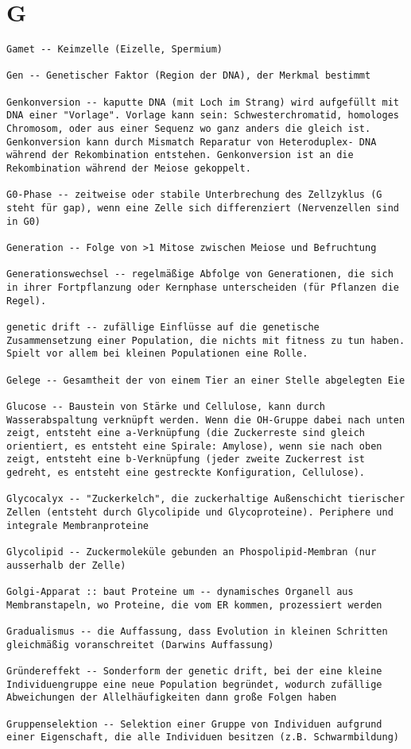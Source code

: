 \documentclass{article}
\begin{document}
\section{G}
\begin{verbatim}
Gamet -- Keimzelle (Eizelle, Spermium)

Gen -- Genetischer Faktor (Region der DNA), der Merkmal bestimmt

Genkonversion -- kaputte DNA (mit Loch im Strang) wird aufgefüllt mit DNA einer "Vorlage". Vorlage kann sein: Schwesterchromatid, homologes Chromosom, oder aus einer Sequenz wo ganz anders die gleich ist. Genkonversion kann durch Mismatch Reparatur von Heteroduplex- DNA während der Rekombination entstehen. Genkonversion ist an die Rekombination während der Meiose gekoppelt.

G0-Phase -- zeitweise oder stabile Unterbrechung des Zellzyklus (G steht für gap), wenn eine Zelle sich differenziert (Nervenzellen sind in G0)

Generation -- Folge von >1 Mitose zwischen Meiose und Befruchtung

Generationswechsel -- regelmäßige Abfolge von Generationen, die sich in ihrer Fortpflanzung oder Kernphase unterscheiden (für Pflanzen die Regel).

genetic drift -- zufällige Einflüsse auf die genetische Zusammensetzung einer Population, die nichts mit fitness zu tun haben. Spielt vor allem bei kleinen Populationen eine Rolle.

Gelege -- Gesamtheit der von einem Tier an einer Stelle abgelegten Eie

Glucose -- Baustein von Stärke und Cellulose, kann durch Wasserabspaltung verknüpft werden. Wenn die OH-Gruppe dabei nach unten zeigt, entsteht eine a-Verknüpfung (die Zuckerreste sind gleich orientiert, es entsteht eine Spirale: Amylose), wenn sie nach oben zeigt, entsteht eine b-Verknüpfung (jeder zweite Zuckerrest ist gedreht, es entsteht eine gestreckte Konfiguration, Cellulose).

Glycocalyx -- "Zuckerkelch", die zuckerhaltige Außenschicht tierischer Zellen (entsteht durch Glycolipide und Glycoproteine). Periphere und integrale Membranproteine

Glycolipid -- Zuckermoleküle gebunden an Phospolipid-Membran (nur ausserhalb der Zelle)

Golgi-Apparat :: baut Proteine um -- dynamisches Organell aus Membranstapeln, wo Proteine, die vom ER kommen, prozessiert werden

Gradualismus -- die Auffassung, dass Evolution in kleinen Schritten gleichmäßig voranschreitet (Darwins Auffassung)

Gründereffekt -- Sonderform der genetic drift, bei der eine kleine Individuengruppe eine neue Population begründet, wodurch zufällige Abweichungen der Allelhäufigkeiten dann große Folgen haben

Gruppenselektion -- Selektion einer Gruppe von Individuen aufgrund einer Eigenschaft, die alle Individuen besitzen (z.B. Schwarmbildung)
\end{verbatim}
\newpage
\end{document}
